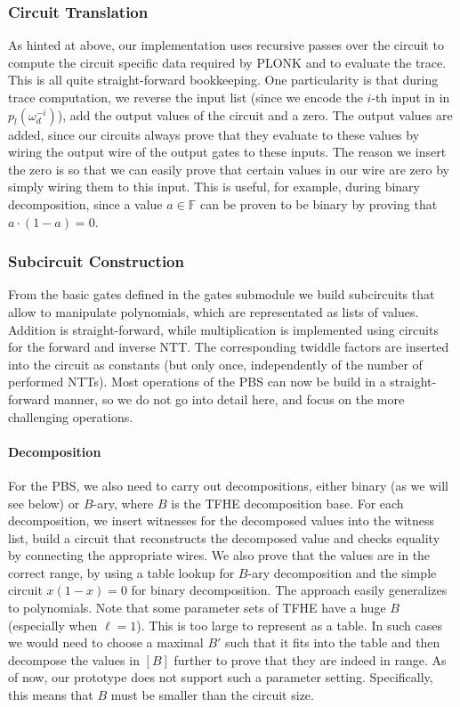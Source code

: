 \documentclass[final]{zamarep}
\newcommand{\field}{\mathbb{F}}
\begin{document}
\subsubsection{Circuit Translation}
\label{sec:trans}
As hinted at above, our implementation uses recursive passes over the circuit to compute the circuit specific data required by PLONK and to evaluate the trace. This is all quite straight-forward bookkeeping. One particularity is that during trace computation, we reverse the input list (since we encode the $i$-th input in in $p_{l}(\omega_d^{-i})$), add the output values of the circuit and a zero. The output values are added, since our circuits always prove that they evaluate to these values by wiring the output wire of the output gates to these inputs. The reason we insert the zero is so that we can easily prove that certain values in our wire are zero by simply wiring them to this input. This is useful, for example, during binary decomposition, since a value $a \in \field$ can be proven to be binary by proving that $a \cdot (1 - a) = 0$.

\subsubsection{Subcircuit Construction}
\label{sec:subcircuit}

From the basic gates defined in the gates submodule we build subcircuits that allow to manipulate polynomials, which are representated as lists of values. Addition is straight-forward, while multiplication is implemented using circuits for the forward and inverse NTT. The corresponding twiddle factors are inserted into the circuit as constants (but only once, independently of the number of performed NTTs). Most operations of the PBS can now be build in a straight-forward manner, so we do not go into detail here, and focus on the more challenging operations.

\paragraph{Decomposition}
For the PBS, we also need to carry out decompositions, either binary (as we will see below) or $B$-ary, where $B$ is the TFHE decomposition base. For each decomposition, we insert witnesses for the decomposed values into the witness list, build a circuit that reconstructs the decomposed value and checks equality by connecting the appropriate wires. We also prove that the values are in the correct range, by using a table lookup for $B$-ary decomposition and the simple circuit $x (1-x) = 0$ for binary decomposition. The approach easily generalizes to polynomials. Note that some parameter sets of TFHE have a huge $B$ (especially when $\ell=1$). This is too large to represent as a table. In such cases we would need to choose a maximal $B'$ such that it fits into the table and then decompose the values in $[B]$ further to prove that they are indeed in range. As of now, our prototype does not support such a parameter setting. Specifically, this means that $B$ must be smaller than the circuit size.
\end{document}
